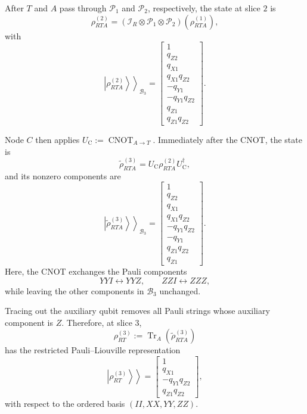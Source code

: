After \(T\) and \(A\) pass through \(\mathcal P_1\) and
\(\mathcal P_2\), respectively, the state at slice \(2\) is
\begin{equation}
\rho_{RTA}^{(2)}
=
\left(
\mathcal I_R\otimes\mathcal P_1\otimes\mathcal P_2
\right)
\left(\rho_{RTA}^{(1)}\right),
\end{equation}
with
\begin{equation}
\left.\left|\rho_{RTA}^{(2)}\right\rangle\right\rangle_{\mathcal B_3}
=
\begin{bmatrix}
1\\
q_{Z2}\\
q_{X1}\\
q_{X1}q_{Z2}\\
-q_{Y1}\\
-q_{Y1}q_{Z2}\\
q_{Z1}\\
q_{Z1}q_{Z2}
\end{bmatrix}.
\end{equation}

Node \(C\) then applies
\(U_{\mathrm C}:=\operatorname{CNOT}_{A\rightarrow T}\).
Immediately after the CNOT, the state is
\begin{equation}
\widetilde{\rho}_{RTA}^{(3)}
=
U_{\mathrm C}\rho_{RTA}^{(2)}U_{\mathrm C}^{\dagger},
\end{equation}
and its nonzero components are
\begin{equation}
\left.\left|\widetilde{\rho}_{RTA}^{(3)}
\right\rangle\right\rangle_{\mathcal B_3}
=
\begin{bmatrix}
1\\
q_{Z2}\\
q_{X1}\\
q_{X1}q_{Z2}\\
-q_{Y1}q_{Z2}\\
-q_{Y1}\\
q_{Z1}q_{Z2}\\
q_{Z1}
\end{bmatrix}.
\end{equation}
Here, the CNOT exchanges the Pauli components
\[
YYI\longleftrightarrow YYZ,
\qquad
ZZI\longleftrightarrow ZZZ,
\]
while leaving the other components in \(\mathcal B_3\) unchanged.

Tracing out the auxiliary qubit removes all Pauli strings whose
auxiliary component is \(Z\). Therefore, at slice \(3\),
\begin{equation}
\rho_{RT}^{(3)}
:=
\operatorname{Tr}_A
\left(\widetilde{\rho}_{RTA}^{(3)}\right)
\end{equation}
has the restricted Pauli--Liouville representation
\begin{equation}
\left.\left|\rho_{RT}^{(3)}\right\rangle\right\rangle
=
\begin{bmatrix}
1\\
q_{X1}\\
-q_{Y1}q_{Z2}\\
q_{Z1}q_{Z2}
\end{bmatrix},
\end{equation}
with respect to the ordered basis
\((II,XX,YY,ZZ)\).

